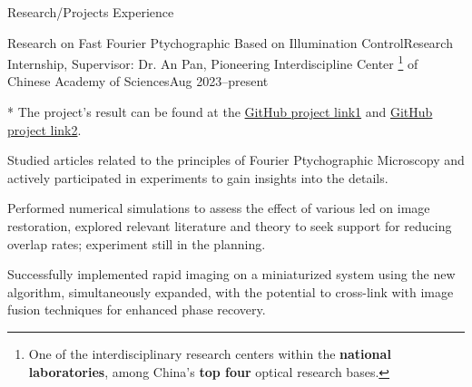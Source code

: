 \documentclass[]{kyvernitis-resume}
\begin{document}
\begin{section}{\Large Research/Projects Experience}



    \begin{subsection}{Research on Fast Fourier Ptychographic Based on Illumination Control}{Research Internship, Supervisor: Dr. An Pan, Pioneering Interdiscipline Center \footnote{One of the interdisciplinary research centers within the \textbf{national laboratories}, among China's \textbf{top four} optical research bases.}
 of Chinese Academy of Sciences}{Aug 2023--present}{}
     \item[*] The project's result can be found at the \href{https://wang-zhiping.github.io/ResearchSummary&Reporting/FPM/single-fast.html}{GitHub project link1} and  \href{https://wang-zhiping.github.io/ResearchSummary&Reporting/FPM/fusion.html}{GitHub project link2}.
        \item Studied articles related to the principles of Fourier Ptychographic Microscopy and actively participated in experiments to gain insights into the details.
        \item Performed numerical simulations to assess the effect of various led on image restoration, explored relevant literature and theory to seek support for reducing overlap rates;  experiment still in the planning.
        \item Successfully implemented rapid imaging on a miniaturized system using the new algorithm, simultaneously expanded, with the potential to cross-link with image fusion techniques for enhanced phase recovery.

    
    \end{subsection}



\end{section}
\end{document}
